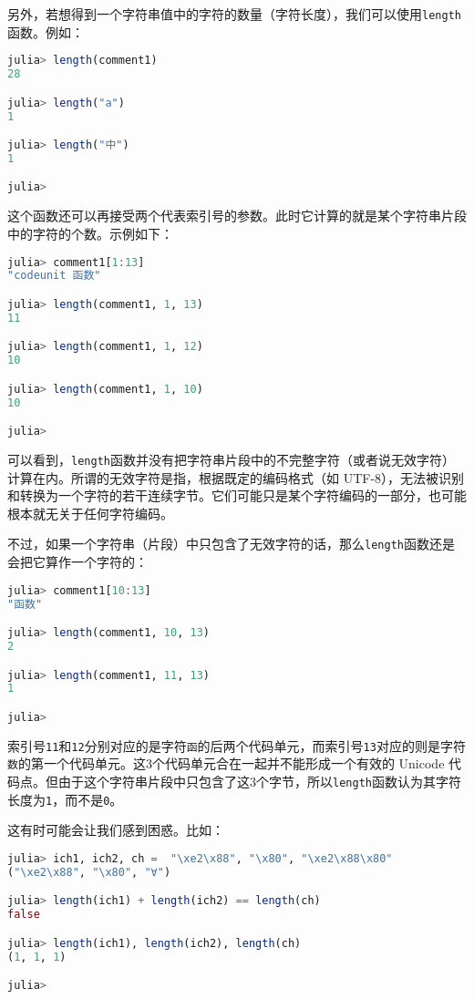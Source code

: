另外，若想得到一个字符串值中的字符的数量（字符长度），我们可以使用\verb`length`函数。例如：
\begin{lstlisting}[language=julia]
julia> length(comment1)
28

julia> length("a")
1

julia> length("中")
1

julia> 
\end{lstlisting}

这个函数还可以再接受两个代表索引号的参数。此时它计算的就是某个字符串片段中的字符的个数。示例如下：
\begin{lstlisting}[language=julia]
julia> comment1[1:13]
"codeunit 函数"

julia> length(comment1, 1, 13)
11

julia> length(comment1, 1, 12)
10

julia> length(comment1, 1, 10)
10

julia> 
\end{lstlisting}

可以看到，\verb`length`函数并没有把字符串片段中的不完整字符（或者说无效字符）计算在内。所谓的无效字符是指，根据既定的编码格式（如 UTF-8），无法被识别和转换为一个字符的若干连续字节。它们可能只是某个字符编码的一部分，也可能根本就无关于任何字符编码。

不过，如果一个字符串（片段）中只包含了无效字符的话，那么\verb`length`函数还是会把它算作一个字符的：
\begin{lstlisting}[language=julia]
julia> comment1[10:13]
"函数"

julia> length(comment1, 10, 13)
2

julia> length(comment1, 11, 13)
1

julia> 
\end{lstlisting}

索引号\verb`11`和\verb`12`分别对应的是字符\verb`函`的后两个代码单元，而索引号\verb`13`对应的则是字符\verb`数`的第一个代码单元。这3个代码单元合在一起并不能形成一个有效的 Unicode 代码点。但由于这个字符串片段中只包含了这3个字节，所以\verb`length`函数认为其字符长度为\verb`1`，而不是\verb`0`。

这有时可能会让我们感到困惑。比如：
\begin{lstlisting}[language=julia]
julia> ich1, ich2, ch =  "\xe2\x88", "\x80", "\xe2\x88\x80"
("\xe2\x88", "\x80", "∀")

julia> length(ich1) + length(ich2) == length(ch)
false

julia> length(ich1), length(ich2), length(ch)
(1, 1, 1)

julia> 
\end{lstlisting}

